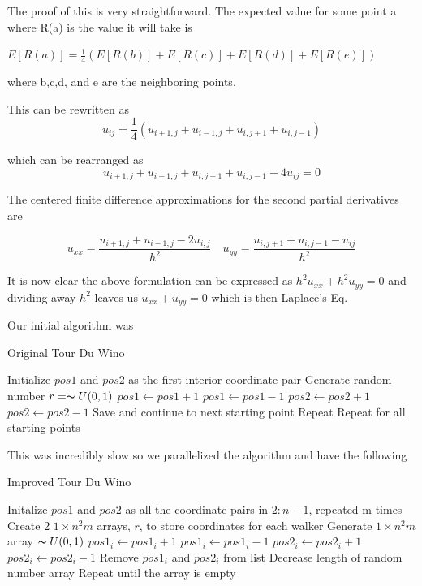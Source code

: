\documentclass{amsart}
\begin{document}
The proof of this is very straightforward. The expected value for some point a where R(a) is the value it will take is

$ E[R(a)] = \frac{1}{4} (E[R(b)] + E[R(c)] + E[R(d)] + E[R(e)]  )$

where b,c,d, and e are the neighboring points.

This can be rewritten as
\begin{equation}
u_{ij} = \frac{1}{4} (u_{i+1,j} + u_{i-1,j} + u_{i,j+1} + u_{i,j-1})
\end{equation}

which can be rearranged as
\begin{equation*}
u_{i+1,j} + u_{i-1,j} + u_{i,j+1} + u_{i,j-1} - 4u_{ij} = 0
\end{equation*}

The centered finite difference approximations for the second partial derivatives are

\begin{equation*} 
	u_{xx} = \frac{u_{i+1,j} + u_{i-1,j} - 2u_{i,j}}{h^2} \quad u_{yy} = \frac{u_{i,j+1} + u_{i,j-1} - u_{ij}}{h^2}
\end{equation*}

It is now clear the above formulation can be expressed as $h^2 u_{xx} + h^2 u_{yy} = 0$ and dividing away $h^2$ leaves us $u_{xx} + u_{yy} = 0$ which is then Laplace's Eq.

Our initial algorithm was
\begin{algorithm}
	\caption{Original Tour Du Wino}
	\begin{algorithmic}[1]
		\State Initialize $pos1$ and $pos2$ as the first interior coordinate pair
		\State Generate random number $r = \thicksim U(0,1)$
			\State $pos1 \gets pos1 + 1$
			\State $pos1 \gets pos1 - 1$
			\State $pos2 \gets pos2 + 1$
		\Else
			\State $pos2 \gets pos2 - 1$
		\EndIf
			\State Save and continue to next starting point
		\Else
			\State Repeat
		\EndIf
		\State Repeat for all starting points
	\end{algorithmic}
\end{algorithm}

This was incredibly slow so we parallelized the algorithm and have the following
\begin{algorithm}
	\caption{Improved Tour Du Wino}
	\begin{algorithmic}[1]
		\State Initalize $pos1$ and $pos2$ as all the coordinate pairs in $2:n-1$, repeated m  times
		\State Create 2 $1 \times n^2m$ arrays, $r$, to store coordinates for each walker
		\State Generate $1 \times n^2m$ array $\thicksim U(0,1)$
			\State $pos1_i \gets pos1_i + 1$
			\State $pos1_i \gets pos1_i - 1$
			\State $pos2_i \gets pos2_i + 1$
		\Else
			\State $pos2_i \gets pos2_i - 1$
		\EndIf
			\State Remove $pos1_i$ and $pos2_i$ from list
			\State Decrease length of random number array
		\EndIf
		\State Repeat until the array is empty
	\end{algorithmic}
\end{algorithm}
\end{document}
